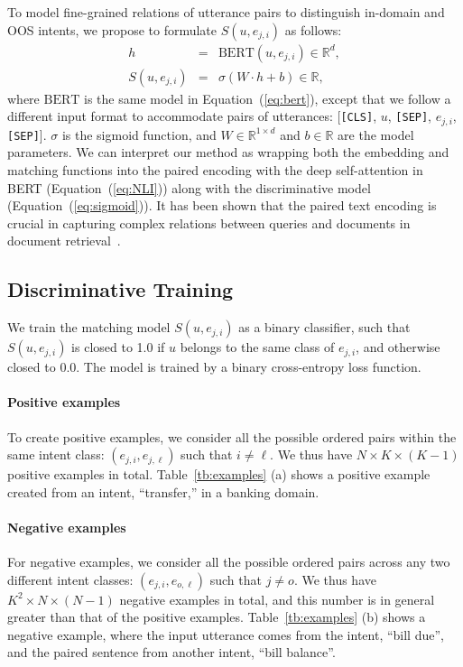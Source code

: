 To model fine-grained relations of utterance pairs to distinguish in-domain and OOS intents, we propose to formulate $S(u, e_{j, i})$ as follows:
\begin{eqnarray}
    h &=& \mathrm{BERT}(u, e_{j, i}) \in\mathbb{R}^{d}, \label{eq:NLI} \\
    S(u, e_{j, i}) &=& \sigma(W \cdot h + b) \in\mathbb{R}, \label{eq:sigmoid}
\end{eqnarray}
where $\mathrm{BERT}$ is the same model in Equation~(\ref{eq:bert}), except that we follow a different input format to accommodate pairs of utterances: [{\tt[CLS]}, $u$, {\tt[SEP]}, $e_{j, i}$, {\tt[SEP]}].
$\sigma$ is the sigmoid function, and $W\in\mathbb{R}^{1\times d}$ and $b\in\mathbb{R}$ are the model parameters.
We can interpret our method as wrapping both the embedding and matching functions into the paired encoding with the deep self-attention in BERT (Equation~(\ref{eq:NLI})) along with the discriminative model (Equation~(\ref{eq:sigmoid})).
It has been shown that the paired text encoding is crucial in capturing complex relations between queries and documents in document retrieval~\citep{watanabe-query,sem-bert,graph-retriever}.


\subsection{Discriminative Training}
\label{subsec:pos_neg}

We train the matching model $S(u, e_{j, i})$ as a binary classifier, such that $S(u, e_{j, i})$ is closed to 1.0 if $u$ belongs to the same class of $e_{j, i}$, and otherwise closed to 0.0.
The model is trained by a binary cross-entropy loss function.

\paragraph{Positive examples}
To create positive examples, we consider all the possible ordered pairs within the same intent class: $(e_{j, i}, e_{j, \ell})$ such that $i \neq \ell$.
We thus have $N\times K\times(K-1)$ positive examples in total.
Table~\ref{tb:examples} (a) shows a positive example created from an intent, ``transfer,'' in a banking domain.

\paragraph{Negative examples}
For negative examples, we consider all the possible ordered pairs across any two different intent classes: $(e_{j, i}, e_{o, \ell})$ such that $j \neq o$.
We thus have $K^2\times N\times(N-1)$ negative examples in total, and this number is in general greater than that of the positive examples.
Table~\ref{tb:examples} (b) shows a negative example, where the input utterance comes from the intent, ``bill due'', and the paired sentence from another intent, ``bill balance''. 



